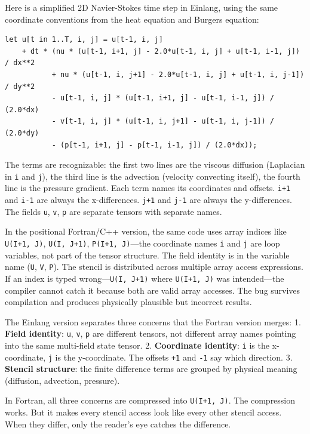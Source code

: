 \documentclass[11pt,titlepage]{article}
\begin{document}
Here is a simplified 2D Navier-Stokes time step in Einlang, using the
same coordinate conventions from the heat equation and Burgers equation:

\begin{verbatim}
let u[t in 1..T, i, j] = u[t-1, i, j]
    + dt * (nu * (u[t-1, i+1, j] - 2.0*u[t-1, i, j] + u[t-1, i-1, j]) / dx**2
           + nu * (u[t-1, i, j+1] - 2.0*u[t-1, i, j] + u[t-1, i, j-1]) / dy**2
           - u[t-1, i, j] * (u[t-1, i+1, j] - u[t-1, i-1, j]) / (2.0*dx)
           - v[t-1, i, j] * (u[t-1, i, j+1] - u[t-1, i, j-1]) / (2.0*dy)
           - (p[t-1, i+1, j] - p[t-1, i-1, j]) / (2.0*dx));
\end{verbatim}

The terms are recognizable: the first two lines are the viscous
diffusion (Laplacian in \texttt{i} and \texttt{j}), the third line is
the advection (velocity convecting itself), the fourth line is the
pressure gradient. Each term names its coordinates and offsets.
\texttt{i+1} and \texttt{i-1} are always the x-differences. \texttt{j+1}
and \texttt{j-1} are always the y-differences. The fields \texttt{u},
\texttt{v}, \texttt{p} are separate tensors with separate names.

In the positional Fortran/C++ version, the same code uses array indices
like \texttt{U(I+1,\ J)}, \texttt{U(I,\ J+1)}, \texttt{P(I+1,\ J)}---the
coordinate names \texttt{i} and \texttt{j} are loop variables, not part
of the tensor structure. The field identity is in the variable name
(\texttt{U}, \texttt{V}, \texttt{P}). The stencil is distributed across
multiple array access expressions. If an index is typed
wrong---\texttt{U(I,\ J+1)} where \texttt{U(I+1,\ J)} was intended---the
compiler cannot catch it because both are valid array accesses. The bug
survives compilation and produces physically plausible but incorrect
results.

The Einlang version separates three concerns that the Fortran version
merges: 1. \textbf{Field identity}: \texttt{u}, \texttt{v}, \texttt{p}
are different tensors, not different array names pointing into the same
multi-field state tensor. 2. \textbf{Coordinate identity}: \texttt{i} is
the x-coordinate, \texttt{j} is the y-coordinate. The offsets
\texttt{+1} and \texttt{-1} say which direction. 3. \textbf{Stencil
structure}: the finite difference terms are grouped by physical meaning
(diffusion, advection, pressure).

In Fortran, all three concerns are compressed into \texttt{U(I+1,\ J)}.
The compression works. But it makes every stencil access look like every
other stencil access. When they differ, only the reader's eye catches
the difference.
\end{document}
